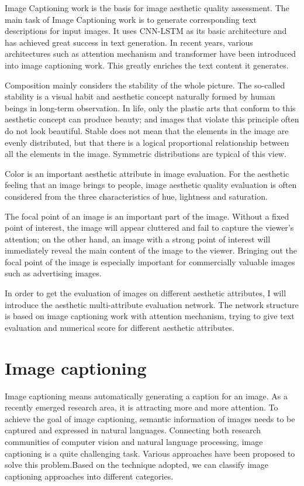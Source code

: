 \documentclass[xelatex,a4j,10pt,twocolumn]{article}
\begin{document}
Image Captioning work is the basis for image aesthetic quality assessment. The main task of Image Captioning work is to generate corresponding text descriptions for input images. It uses CNN-LSTM as its basic architecture and has achieved great success in text generation. In recent years, various architectures such as attention mechanism and transformer have been introduced into image captioning work. This greatly enriches the text content it generates.

Composition mainly considers the stability of the whole picture. The so-called stability is a visual habit and aesthetic concept naturally formed by human beings in long-term observation. In life, only the plastic arts that conform to this aesthetic concept can produce beauty; and images that violate this principle often do not look beautiful. Stable does not mean that the elements in the image are evenly distributed, but that there is a logical proportional relationship between all the elements in the image. Symmetric distributions are typical of this view.

Color is an important aesthetic attribute in image evaluation. For the aesthetic feeling that an image brings to people, image aesthetic quality evaluation is often considered from the three characteristics of hue, lightness and saturation.

The focal point of an image is an important part of the image. Without a fixed point of interest, the image will appear cluttered and fail to capture the viewer's attention; on the other hand, an image with a strong point of interest will immediately reveal the main content of the image to the viewer. Bringing out the focal point of the image is especially important for commercially valuable images such as advertising images.

In order to get the evaluation of images on different aesthetic attributes, I will introduce the aesthetic multi-attribute evaluation network. The network structure is based on image captioning work with attention mechanism, trying to give text evaluation and numerical score for different aesthetic attributes.

\section{Image captioning}
Image captioning\cite{9cap,10cap,11cap} means automatically generating a caption for an image. As a recently emerged research area, it is attracting more and more attention. To achieve the goal of image captioning, semantic information of images needs to be captured and expressed in natural languages. Connecting both research communities of computer vision and natural language processing, image captioning is a quite challenging task. Various approaches have been proposed to solve this problem.Based on the technique adopted, we can classify image captioning approaches into different categories.
\end{document}
